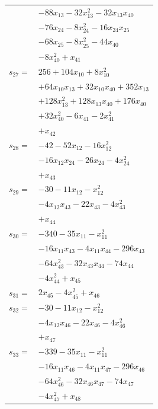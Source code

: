 \begin{longtable}{@{}r@{\;}l@{}}
 & \(\displaystyle -88x_{13} -32x_{13}^{2} -32x_{13}x_{40}\) \\
 & \(\displaystyle -76x_{24} -8x_{24}^{2} -16x_{24}x_{25}\) \\
 & \(\displaystyle -68x_{25} -8x_{25}^{2} -44x_{40}\) \\
 & \(\displaystyle -8x_{40}^{2} +x_{41}\) \\[3pt]
\(s_{27}=\) & \(\displaystyle 256 +104x_{10} +8x_{10}^{2}\) \\
 & \(\displaystyle +64x_{10}x_{13} +32x_{10}x_{40} +352x_{13}\) \\
 & \(\displaystyle +128x_{13}^{2} +128x_{13}x_{40} +176x_{40}\) \\
 & \(\displaystyle +32x_{40}^{2} -6x_{41} -2x_{41}^{2}\) \\
 & \(\displaystyle +x_{42}\) \\[3pt]
\(s_{28}=\) & \(\displaystyle -42 -52x_{12} -16x_{12}^{2}\) \\
 & \(\displaystyle -16x_{12}x_{24} -26x_{24} -4x_{24}^{2}\) \\
 & \(\displaystyle +x_{43}\) \\[3pt]
\(s_{29}=\) & \(\displaystyle -30 -11x_{12} -x_{12}^{2}\) \\
 & \(\displaystyle -4x_{12}x_{43} -22x_{43} -4x_{43}^{2}\) \\
 & \(\displaystyle +x_{44}\) \\[3pt]
\(s_{30}=\) & \(\displaystyle -340 -35x_{11} -x_{11}^{2}\) \\
 & \(\displaystyle -16x_{11}x_{43} -4x_{11}x_{44} -296x_{43}\) \\
 & \(\displaystyle -64x_{43}^{2} -32x_{43}x_{44} -74x_{44}\) \\
 & \(\displaystyle -4x_{44}^{2} +x_{45}\) \\[3pt]
\(s_{31}=\) & \(\displaystyle 2x_{45} -4x_{45}^{2} +x_{46}\) \\[3pt]
\(s_{32}=\) & \(\displaystyle -30 -11x_{12} -x_{12}^{2}\) \\
 & \(\displaystyle -4x_{12}x_{46} -22x_{46} -4x_{46}^{2}\) \\
 & \(\displaystyle +x_{47}\) \\[3pt]
\(s_{33}=\) & \(\displaystyle -339 -35x_{11} -x_{11}^{2}\) \\
 & \(\displaystyle -16x_{11}x_{46} -4x_{11}x_{47} -296x_{46}\) \\
 & \(\displaystyle -64x_{46}^{2} -32x_{46}x_{47} -74x_{47}\) \\
 & \(\displaystyle -4x_{47}^{2} +x_{48}\) \\[3pt]

\end{longtable}
